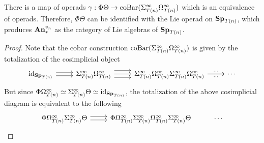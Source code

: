 	\begin{thm}\label{Bousfield_Kuhn_Tel_loc_Lie_alg}
		There is a map of operads $\gamma:\Phi\Theta\to\operatorname{\mathrm{coBar}}(\Sigma^\infty_{T(n)}\Omega^\infty_{T(n)})$ which is an equivalence of operads. Therefore, $\Phi\Theta$ can be identified with the Lie operad on $\mathbf{Sp}_{T(n)}$, which produces $\mathbf{An}_*^{v_n}$ as the category of Lie algebras of $\mathbf{Sp}_{T(n)}$. 
	\end{thm}
	\begin{proof}
		Note that the cobar construction $\operatorname{\mathrm{coBar}}(\Sigma^\infty_{T(n)}\Omega^\infty_{T(n)})$ is given by the totalization of the cosimplicial object 
		\[\begin{tikzcd}[ampersand replacement=\&]
			{\id_{\Sp_{T(n)}}} \& {\Sigma^\infty_{T(n)}\Omega^\infty_{T(n)}} \& {\Sigma^\infty_{T(n)}\Omega^\infty_{T(n)}\Sigma^\infty_{T(n)}\Omega^\infty_{T(n)}} \& \cdots
			\arrow[shift right, from=1-1, to=1-2]
			\arrow[shift left, from=1-1, to=1-2]
			\arrow[from=1-2, to=1-3]
			\arrow[shift right=2, from=1-2, to=1-3]
			\arrow[shift left=2, from=1-2, to=1-3]
			\arrow["\cdots"', from=1-3, to=1-4]
			\arrow["\cdots", from=1-3, to=1-4]
		\end{tikzcd}\]
		But since $\Phi\Omega^\infty_{T(n)}\simeq\Sigma^\infty_{T(n)}\Theta\simeq\operatorname{\mathrm{id}}_{\mathbf{Sp}_{T(n)}}$, the totalization of the above cosimplicial diagram is equivalent to the following %
		\[\begin{tikzcd}[ampersand replacement=\&]
			{\Phi\Omega^\infty_{T(n)}\Sigma^\infty_{T(n)}\Theta} \& {\Phi\Omega^\infty_{T(n)}\Sigma^\infty_{T(n)}\Omega^\infty_{T(n)}\Sigma^\infty_{T(n)}\Theta} \& \cdots
			\arrow[shift right, from=1-1, to=1-2]
			\arrow[shift left, from=1-1, to=1-2]

\end{tikzcd}\]
\end{proof}
